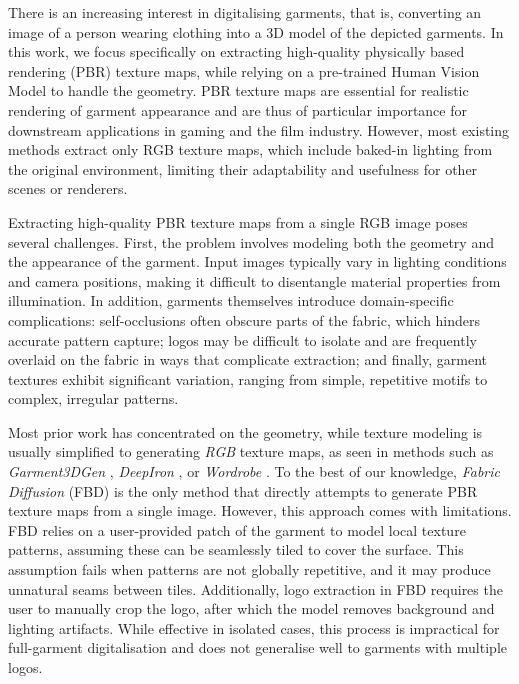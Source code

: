 \documentclass[11pt,twocolumn]{article}
\begin{document}
There is an increasing interest in digitalising garments, that is, converting an image of a person wearing clothing into a 3D model 
of the depicted garments. In this work, we focus specifically on extracting high-quality physically based rendering (PBR) texture maps, 
while relying on a pre-trained Human Vision Model to handle the geometry. 
PBR texture maps are essential for realistic rendering of garment appearance and are thus of particular importance for downstream applications 
in gaming and the film industry. However, most existing methods extract only RGB texture maps, 
which include baked-in lighting from the original environment, limiting their adaptability and usefulness for other 
scenes or renderers.

Extracting high-quality PBR texture maps from a single RGB image poses several challenges. 
First, the problem involves modeling both the geometry and the appearance of the garment. 
Input images typically vary in lighting conditions and camera positions, making it difficult to disentangle material 
properties from illumination. In addition, garments themselves introduce domain-specific complications: 
self-occlusions often obscure parts of the fabric, which hinders accurate pattern capture; 
logos may be difficult to isolate and are frequently overlaid on the fabric in ways that complicate extraction; 
and finally, garment textures exhibit significant variation, ranging from simple, repetitive motifs to complex, 
irregular patterns.

Most prior work has concentrated on the geometry, while texture modeling is usually simplified to generating \textit{RGB} 
texture maps, as seen in methods such as \textit{Garment3DGen} \cite{garment3dgen}, \textit{DeepIron} \cite{deepiron}, 
or \textit{Wordrobe} \cite{WordRobe}. To the best of our knowledge, \textit{Fabric Diffusion} (FBD) \cite{fabricdiffusion} is 
the only method that directly attempts to generate PBR texture maps from a single image. 
However, this approach comes with limitations. FBD relies on a user-provided patch of the garment to model local 
texture patterns, assuming these can be seamlessly tiled to cover the surface. This assumption fails when patterns are not 
globally repetitive, and it may produce unnatural seams between tiles. 
Additionally, logo extraction in FBD requires the user to manually crop the logo, 
after which the model removes background and lighting artifacts. 
While effective in isolated cases, this process is impractical for full-garment digitalisation and does not 
generalise well to garments with multiple logos.
\end{document}
